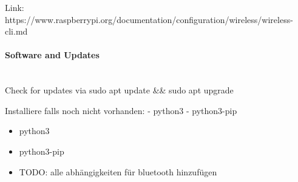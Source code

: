 Link: https://www.raspberrypi.org/documentation/configuration/wireless/wireless-cli.md

\paragraph{Software and Updates} \hspace{0pt} \\
Check for updates via sudo apt update \&\& sudo apt upgrade

Installiere falls noch nicht vorhanden:
- python3
- python3-pip 
\begin{itemize}
  \item python3
  \item python3-pip
  \item TODO: alle abhängigkeiten für bluetooth hinzufügen
\end{itemize}


